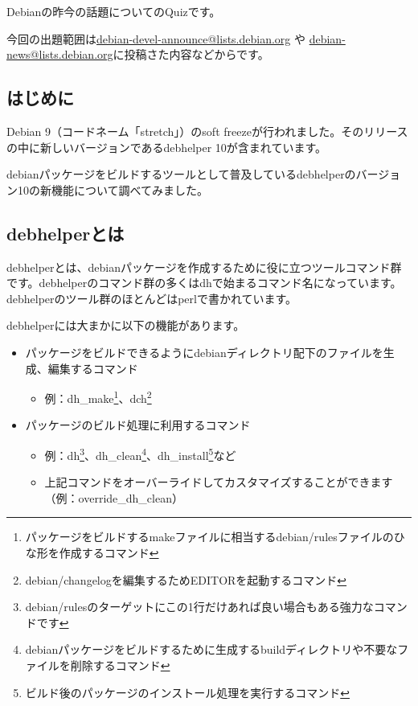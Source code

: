 \documentclass[mingoth,a4paper]{jsarticle}
\begin{document}
Debianの昨今の話題についてのQuizです。

今回の出題範囲は\url{debian-devel-announce@lists.debian.org} や \url{debian-news@lists.debian.org}に投稿さた内容などからです。

\begin{multicols}{2}

\end{multicols}




\subsection{はじめに}

Debian 9（コードネーム「stretch」）のsoft freezeが行われました。そのリリースの中に新しいバージョンであるdebhelper 10が含まれています。

debianパッケージをビルドするツールとして普及しているdebhelperのバージョン10の新機能について調べてみました。


\subsection{debhelperとは}

debhelperとは、debianパッケージを作成するために役に立つツールコマンド群です。debhelperのコマンド群の多くはdhで始まるコマンド名になっています。debhelperのツール群のほとんどはperlで書かれています。

debhelperには大まかに以下の機能があります。

\begin{itemize}
\item パッケージをビルドできるようにdebianディレクトリ配下のファイルを生成、編集するコマンド
  \begin{itemize}
  \item 例：dh\_make\footnote{パッケージをビルドするmakeファイルに相当するdebian/rulesファイルのひな形を作成するコマンド}、dch\footnote{debian/changelogを編集するためEDITORを起動するコマンド}
  \end{itemize}
\item パッケージのビルド処理に利用するコマンド
  \begin{itemize}
  \item 例：dh\footnote{debian/rulesのターゲットにこの1行だけあれば良い場合もある強力なコマンドです}、dh\_clean\footnote{debianパッケージをビルドするために生成するbuildディレクトリや不要なファイルを削除するコマンド}、dh\_install\footnote{ビルド後のパッケージのインストール処理を実行するコマンド}など
  \item 上記コマンドをオーバーライドしてカスタマイズすることができます（例：override\_dh\_clean）
  \end{itemize}
\end{itemize}
\end{document}
